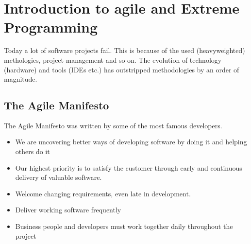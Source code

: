 \hypertarget{introduction-to-agile-and-extreme-programming}{%
\section{Introduction to agile and Extreme
Programming}\label{introduction-to-agile-and-extreme-programming}}

Today a lot of software projects fail. This is because of the used
(heavyweighted) methologies, project management and so on. The evolution
of technology (hardware) and tools (IDEs etc.) has outstripped
methodologies by an order of magnitude.

\hypertarget{the-agile-manifesto}{%
\subsection{The Agile Manifesto}\label{the-agile-manifesto}}

The Agile Manifesto was written by some of the most famous developers.

\begin{itemize}
\tightlist
\item
  We are uncovering better ways of developing software by doing it and
  helping others do it
\item
  Our highest priority is to satisfy the customer through early and
  continuous delivery of valuable software.
\item
  Welcome changing requirements, even late in development.
\item
  Deliver working software frequently
\item
  Business people and developers must work together daily throughout the
  project
\end{itemize}

